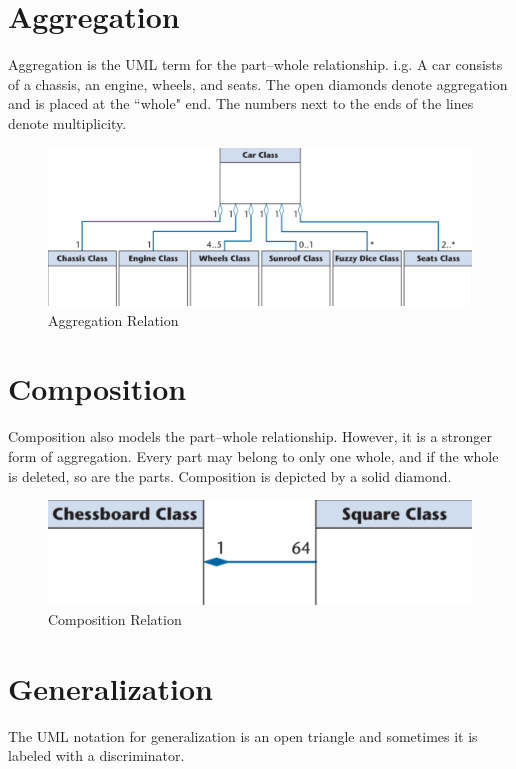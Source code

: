 \documentclass[11pt]{article}
\begin{document}
\newpage
\section*{Aggregation}

Aggregation is the UML term for the part–whole relationship. i.g. A car consists of a chassis, an engine, wheels, and seats. The open diamonds denote aggregation and is placed at the ``whole" end. The numbers next to the ends of the lines denote multiplicity.

\begin{figure}[h]
	\centering
	\includegraphics[width=0.8\linewidth]{images/Aggregation.png}
	\caption{Aggregation Relation}
	\label{fig:Aggregation}
\end{figure}


\section*{Composition}

Composition also models the part–whole relationship. However, it is a stronger form of aggregation. Every part may belong to only one whole, and if the whole is deleted, so are the parts. Composition is depicted by a solid diamond.

\begin{figure}[h]
	\centering
	\includegraphics[width=0.5\linewidth]{images/Composition.png}
	\caption{Composition Relation}
	\label{fig:Composition}
\end{figure}

\section*{Generalization}

The UML notation for generalization is an open triangle and sometimes it is labeled with a discriminator.
\end{document}
